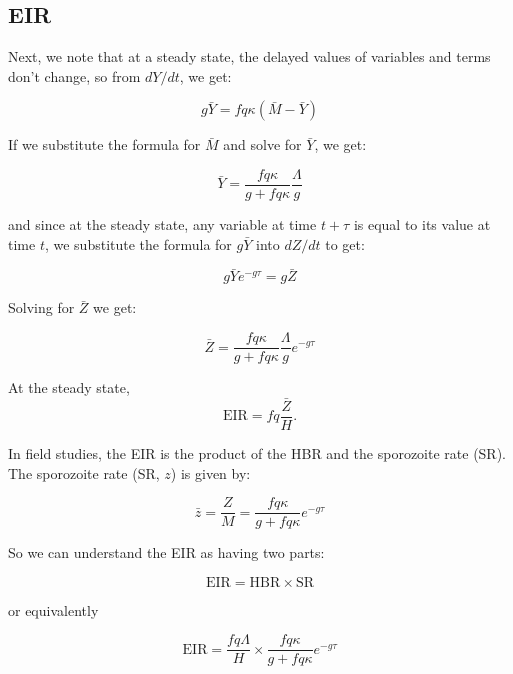 \documentclass[
]{book}
\begin{document}
\hypertarget{eir}{%
\subsection{EIR}\label{eir}}

Next, we note that at a steady state, the delayed values of variables and terms don't change, so from \(dY/dt\), we get:

\begin{equation}
g \bar Y = fq\kappa(\bar M- \bar Y) 
\end{equation}

If we substitute the formula for \(\bar M\) and solve for \(\bar Y\), we get:

\begin{equation}
\bar Y = \frac{fq\kappa}{g + fq\kappa} \frac{\Lambda}{g}
\end{equation}

and since at the steady state, any variable at time \(t+\tau\) is equal to its value at time \(t\), we substitute the formula for \(g \bar Y\) into \(dZ/dt\) to get:

\begin{equation}
g \bar Y e^{-g\tau} = g \bar Z
\end{equation}

Solving for \(\bar Z\) we get:

\begin{equation}
\bar Z =  \frac{f q \kappa}{g + fq \kappa} \frac{\Lambda}{g} e^{-g\tau} 
\end{equation}

At the steady state, \[\mbox{EIR} = fq \frac{\bar Z}{H}.\]

In field studies, the EIR is the product of the HBR and the sporozoite rate (SR). The sporozoite rate (SR, \(z\)) is given by:

\begin{equation}
\bar z =  \frac{Z}{M} = \frac{f q \kappa}{g + fq \kappa} e^{-g\tau} 
\end{equation}

So we can understand the EIR as having two parts:

\begin{equation}
\mbox{EIR} = \mbox{HBR} \times  \mbox{SR} 
\end{equation}

or equivalently

\begin{equation}
\mbox{EIR} = \frac{\textstyle{fq\Lambda}}{\textstyle{H}} \times \frac{\textstyle{f q \kappa}}{\textstyle{g + fq \kappa}} e^{-g\tau} 
\end{equation}
\end{document}
